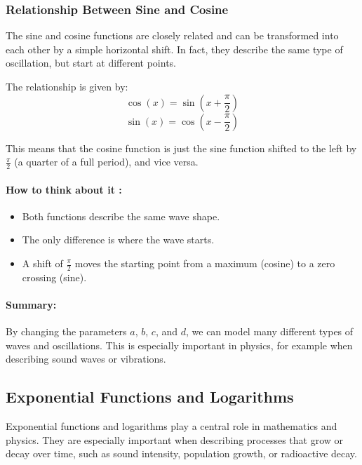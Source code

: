 \subsubsection{Relationship Between Sine and Cosine}

The sine and cosine functions are closely related and can be transformed into each other by a simple horizontal shift. In fact, they describe the same type of oscillation, but start at different points.

The relationship is given by:
\begin{equation}
    \cos(x) = \sin\left(x + \frac{\pi}{2}\right)
\end{equation}
\begin{equation}
    \sin(x) = \cos\left(x - \frac{\pi}{2}\right)
\end{equation}

This means that the cosine function is just the sine function shifted to the left by $\frac{\pi}{2}$ (a quarter of a full period), and vice versa.

\paragraph{How to think about it :}
\begin{itemize}
    \item Both functions describe the same wave shape.
    \item The only difference is where the wave starts.
    \item A shift of $\frac{\pi}{2}$ moves the starting point from a maximum (cosine) to a zero crossing (sine).
\end{itemize}

\paragraph{Summary:}
By changing the parameters $a$, $b$, $c$, and $d$, we can model many different types of waves and oscillations. This is especially important in physics, for example when describing sound waves or vibrations.


\subsection{Exponential Functions and Logarithms}

Exponential functions and logarithms play a central role in mathematics and physics. They are especially important when describing processes that grow or decay over time, such as sound intensity, population growth, or radioactive decay.

